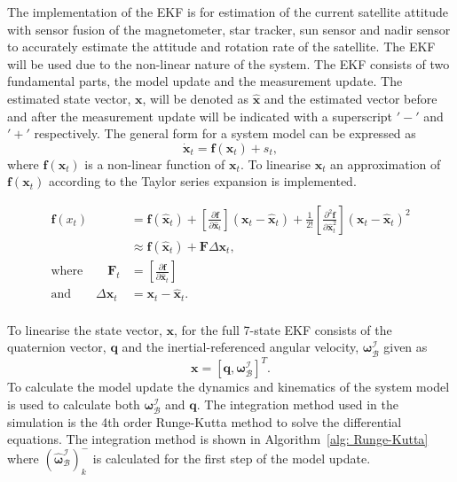 The implementation of the EKF is for estimation of the current satellite attitude with sensor fusion of the magnetometer, star tracker, sun sensor and nadir sensor to accurately estimate the attitude and rotation rate of the satellite. The EKF will be used due to the non-linear nature of the system. The EKF consists of two fundamental parts, the model update and the measurement update. The estimated state vector, $\mathbf{x}$, will be denoted as $\hat{\mathbf{x}}$ and the estimated vector before and after the measurement update will be indicated with a superscript $'-'$ and $'+'$ respectively. The general form for a system model can be expressed as
\begin{equation}
\mathbf{\dot{x}}_t = \mathbf{f}(\mathbf{x}_t) + s_t,
\end{equation}
where $\mathbf{f}(\mathbf{x}_t)$ is a non-linear function of $\mathbf{x}_t$. To linearise $\mathbf{x}_t$ an approximation of $\mathbf{f}(\mathbf{x}_t)$ according to the Taylor series expansion is implemented.

\begin{equation}
\begin{aligned}
\mathbf{f}(x_t) &= \mathbf{f}(\hat{\mathbf{x}}_t) + \left[\frac{\partial \mathbf{f}}{\partial \hat{\mathbf{x}}_t} \right] \left(\mathbf{x}_t - \hat{\mathbf{x}}_t \right) + \frac{1}{2!} \left[\frac{\partial^2 \mathbf{f}}{\partial \hat{\mathbf{x}}_t^2} \right] \left(\mathbf{x}_t - \hat{\mathbf{x}}_t \right)^2 \\
&\approx \mathbf{f} (\hat{\mathbf{x}}_t) + \mathbf{F} \Delta \mathbf{x}_t , \\
\text{where} \qquad \mathbf{F}_t &= \left[\frac{\partial \mathbf{f}}{\partial \hat{\mathbf{x}}_t} \right] \\
\text{and} \qquad \Delta \mathbf{x}_t &= \mathbf{x}_t - \hat{\mathbf{x}}_t. \\
\end{aligned}
\end{equation}


To linearise the state vector, $\mathbf{x}$, for the full 7-state EKF consists of the quaternion vector, $\mathbf{q}$ and the inertial-referenced angular velocity, $\boldsymbol{\omega}_{\mathcal{B}}^{\mathcal{I}}$ given as
\begin{equation}
\mathbf{x} = [\mathbf{q}, \boldsymbol{\omega}_{\mathcal{B}}^{\mathcal{I}}]^T.
\end{equation}
To calculate the model update the dynamics and kinematics of the system model is used to calculate both $\boldsymbol{\omega}_{\mathcal{B}}^{\mathcal{I}}$ and $\mathbf{q}$. The integration method used in the simulation is the 4th order Runge-Kutta method to solve the differential equations. The integration method is shown in Algorithm~\ref{alg: Runge-Kutta} where $(\boldsymbol{\hat{\omega}}_{\mathcal{B}}^{\mathcal{I}})_k^-$ is calculated for the first step of the model update.

